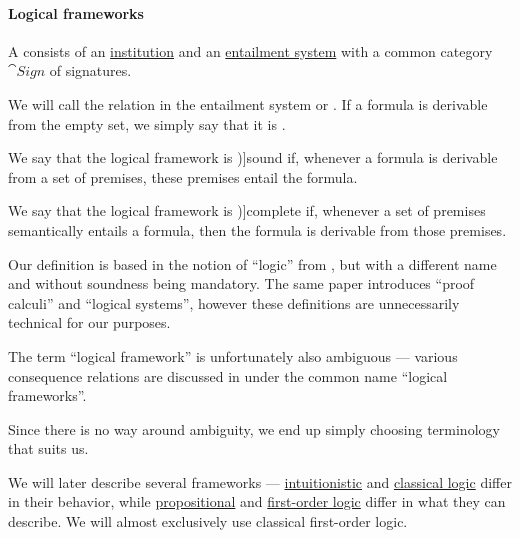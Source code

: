 \paragraph{Logical frameworks}

\begin{definition}\label{def:logical_framework}\mimprovised
  A  consists of an \hyperref[def:institution]{institution} and an \hyperref[def:entailment_system]{entailment system} with a common category \( \cat{Sign} \) of signatures.

  We will call the relation in the entailment system  or . If a formula is derivable from the empty set, we simply say that it is .

  \begin{thmenum}
     We say that the logical framework is \term[ru=корректная (система) (\cite[37]{Герасимов2011Вычислимость})]{sound} if, whenever a formula is derivable from a set of premises, these premises entail the formula.

     We say that the logical framework is \term[ru=полная (система) (\cite[44]{Герасимов2011Вычислимость})]{complete} if, whenever a set of premises semantically entails a formula, then the formula is derivable from those premises.
  \end{thmenum}
\end{definition}
\begin{comments}
  \item Our definition is based in the notion of \enquote{logic} from \cite[def. 6]{Meseguer1989GeneralLogics}, but with a different name and without soundness being mandatory. The same paper introduces \enquote{proof calculi} and \enquote{logical systems}, however these definitions are unnecessarily technical for our purposes.

  The term \enquote{logical framework} is unfortunately also ambiguous --- various consequence relations are discussed in \cite{HuetPlotkin1991LogicalFrameworks} under the common name \enquote{logical frameworks}.

  Since there is no way around ambiguity, we end up simply choosing terminology that suits us.

  \item We will later describe several frameworks --- \hyperref[con:intuitionistic_logic]{intuitionistic} and \hyperref[con:classical_logic]{classical logic} differ in their behavior, while \hyperref[sec:propositional_logic]{propositional} and \hyperref[sec:first_order_logic]{first-order logic} differ in what they can describe. We will almost exclusively use classical first-order logic.
\end{comments}

